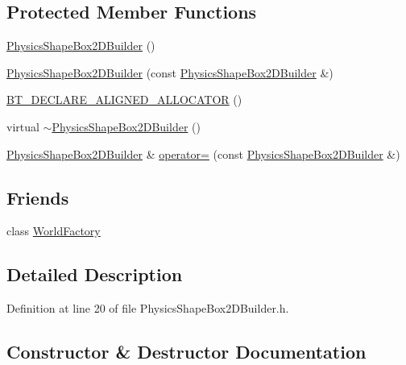 \subsection*{Protected Member Functions}
\begin{DoxyCompactItemize}
\item 
\mbox{\hyperlink{classnjli_1_1_physics_shape_box2_d_builder_a8a59e68653b3237ad1afd4915ed9bef9}{Physics\+Shape\+Box2\+D\+Builder}} ()
\item 
\mbox{\hyperlink{classnjli_1_1_physics_shape_box2_d_builder_ae62021092f97a31992324274c7cfb3dc}{Physics\+Shape\+Box2\+D\+Builder}} (const \mbox{\hyperlink{classnjli_1_1_physics_shape_box2_d_builder}{Physics\+Shape\+Box2\+D\+Builder}} \&)
\item 
\mbox{\hyperlink{classnjli_1_1_physics_shape_box2_d_builder_a92cf42c5f99d27be559a4b9cb4b05acf}{B\+T\+\_\+\+D\+E\+C\+L\+A\+R\+E\+\_\+\+A\+L\+I\+G\+N\+E\+D\+\_\+\+A\+L\+L\+O\+C\+A\+T\+OR}} ()
\item 
virtual \mbox{\hyperlink{classnjli_1_1_physics_shape_box2_d_builder_aa33da8c914fd329211191d2e6050bc15}{$\sim$\+Physics\+Shape\+Box2\+D\+Builder}} ()
\item 
\mbox{\hyperlink{classnjli_1_1_physics_shape_box2_d_builder}{Physics\+Shape\+Box2\+D\+Builder}} \& \mbox{\hyperlink{classnjli_1_1_physics_shape_box2_d_builder_a0fb1a5838c3833566a00d90181ca6598}{operator=}} (const \mbox{\hyperlink{classnjli_1_1_physics_shape_box2_d_builder}{Physics\+Shape\+Box2\+D\+Builder}} \&)
\end{DoxyCompactItemize}
\subsection*{Friends}
\begin{DoxyCompactItemize}
\item 
class \mbox{\hyperlink{classnjli_1_1_physics_shape_box2_d_builder_acb96ebb09abe8f2a37a915a842babfac}{World\+Factory}}
\end{DoxyCompactItemize}


\subsection{Detailed Description}


Definition at line 20 of file Physics\+Shape\+Box2\+D\+Builder.\+h.



\subsection{Constructor \& Destructor Documentation}
\mbox{\label{classnjli_1_1_physics_shape_box2_d_builder_a8a59e68653b3237ad1afd4915ed9bef9}} 
